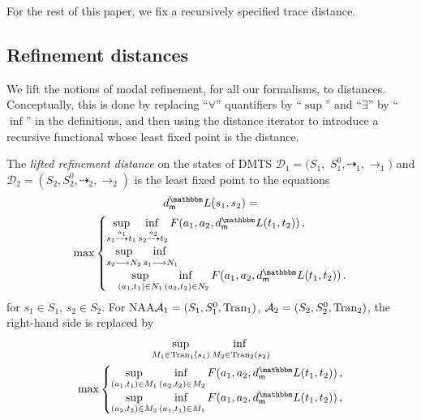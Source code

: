 \documentclass[twocolumn]{svjour3-dummy}
\newcommand*{\must}[1]{\overset{#1}{\longrightarrow}}
\newcommand*{\omust}{\mathord{\must{}}}
\newcommand*\cD{\mathcal D}
\newcommand*{\may}[1]{\overset{#1}{\dashrightarrow}}
\newcommand*{\omay}{\mathord{\may{}}}
\newcommand*\NAA{NAA\xspace}
\newcommand*\cA{\mathcal A}
\newcommand*\Tran{\textup{\textrm{Tran}}}
\begin{document}
For the rest of this paper, we fix a recursively specified trace
distance.

\subsection{Refinement distances}

We lift the notions of modal refinement, for all our formalisms, to
distances.  Conceptually, this is done by replacing ``$\forall$''
quantifiers by ``$\sup$'' and ``$\exists$'' by ``$\inf$'' in the
definitions, and then using the distance iterator to introduce a
recursive functional whose least fixed point is the distance.

\begin{definition}
  \quad The \emph{lifted refinement distance} on the states of DMTS
  $\cD_1=( S_1,$ $S^0_1, \omay_1, \omust_1)$ and $\cD_2=( S_2, S^0_2,
  \omay_2, \omust_2)$ is the least fixed point to the equations
  \begin{multline*}
    \mdl( s_1, s_2)= \\ \max
    \begin{cases}
      &\hspace*{-1em} \adjustlimits \sup_{ s_1\may{ a_1} t_1} \inf_{
        s_2\may{ a_2} t_2} F( a_1, a_2, \mdl( t_1, t_2))\,, \\
      &\hspace*{-1em} \adjustlimits \sup_{ s_2\must{} N_2} \inf_{
        s_1\must{} N_1} \\
      &\adjustlimits \sup_{( a_1, t_1)\in N_1} \inf_{(
        a_2, t_2)\in N_2} F( a_1, a_2, \mdl( t_1, t_2))\,.
    \end{cases}
  \end{multline*}
  for $s_1\in S_1$, $s_2\in S_2$.  For \NAA $\cA_1=( S_1, S^0_1,
  \Tran_1)$, $\cA_2=( S_2, S^0_2, \Tran_2)$, the right-hand side is
  replaced by
  \begin{multline*}
    \adjustlimits \sup_{ M_1\in \Tran_1( s_1)} \inf_{ M_2\in \Tran_2(
      s_2)} \\ \max
    \begin{cases}
      &\hspace*{-1em} \adjustlimits \sup_{( a_1, t_1)\in M_1} \inf_{(
        a_2, t_2)\in M_2} F( a_1, a_2, \mdl( t_1, t_2))\,, \\
      &\hspace*{-1em} \adjustlimits \sup_{( a_2, t_2)\in M_2} \inf_{(
        a_1, t_1)\in M_1} F( a_1, a_2, \mdl( t_1, t_2))\,,
    \end{cases}

\end{multline*}
\end{definition}
\end{document}
